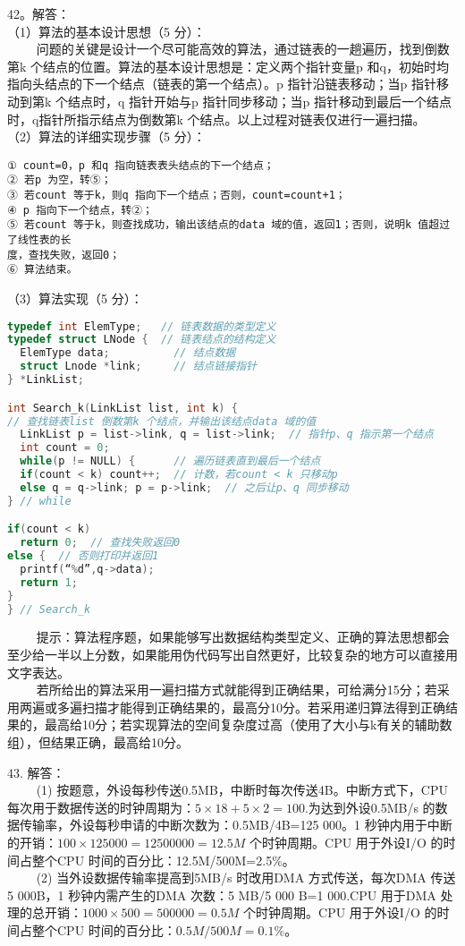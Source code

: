 42。解答： \\
（1）算法的基本设计思想（5 分）： \\
$\qquad$ 问题的关键是设计一个尽可能高效的算法，通过链表的一趟遍历，找到倒数第k 个结点的位置。算法的基本设计思想是：定义两个指针变量p 和q，初始时均指向头结点的下一个结点（链表的第一个结点）。p 指针沿链表移动；当p 指针移动到第k 个结点时，q 指针开始与p 指针同步移动；当p 指针移动到最后一个结点时，q指针所指示结点为倒数第k 个结点。以上过程对链表仅进行一遍扫描。 \\
（2）算法的详细实现步骤（5 分）： 
\begin{lstlisting}[language=none]
① count=0，p 和q 指向链表表头结点的下一个结点；
② 若p 为空，转⑤；
③ 若count 等于k，则q 指向下一个结点；否则，count=count+1；
④ p 指向下一个结点，转②；
⑤ 若count 等于k，则查找成功，输出该结点的data 域的值，返回1；否则，说明k 值超过了线性表的长
度，查找失败，返回0；
⑥ 算法结束。
\end{lstlisting}
（3）算法实现（5 分）： \\
\begin{lstlisting}[language=cpp]
typedef int ElemType;   // 链表数据的类型定义
typedef struct LNode {  // 链表结点的结构定义
  ElemType data;          // 结点数据
  struct Lnode *link;     // 结点链接指针
} *LinkList;

int Search_k(LinkList list, int k) {
// 查找链表list 倒数第k 个结点，并输出该结点data 域的值
  LinkList p = list->link, q = list->link;  // 指针p、q 指示第一个结点
  int count = 0;
  while(p != NULL) {      // 遍历链表直到最后一个结点
  if(count < k) count++;  // 计数，若count < k 只移动p
  else q = q->link; p = p->link;  // 之后让p、q 同步移动
} // while

if(count < k)
  return 0;  // 查找失败返回0
else {  // 否则打印并返回1
  printf(“%d”,q->data);
  return 1;
}
} // Search_k
\end{lstlisting}
$\qquad$ 提示：算法程序题，如果能够写出数据结构类型定义、正确的算法思想都会至少给一半以上分数，如果能用伪代码写出自然更好，比较复杂的地方可以直接用文字表达。 \\
$\qquad$ 若所给出的算法采用一遍扫描方式就能得到正确结果，可给满分15分；若采用两遍或多遍扫描才能得到正确结果的，最高分10分。若采用递归算法得到正确结果的，最高给10分；若实现算法的空间复杂度过高（使用了大小与k有关的辅助数组），但结果正确，最高给10分。

43. 解答： \\
$\qquad$ (1) 按题意，外设每秒传送0.5MB，中断时每次传送4B。中断方式下，CPU 每次用于数据传送的时钟周期为：$5\times18+5\times2=100$.为达到外设0.5MB/s 的数据传输率，外设每秒申请的中断次数为：0.5MB/4B=125 000。1 秒钟内用于中断的开销：$100\times125 000=12 500 000=12.5M$ 个时钟周期。CPU 用于外设I/O 的时间占整个CPU 时间的百分比：12.5M/500M=2.5\%。 \\
$\qquad$ (2) 当外设数据传输率提高到5MB/s 时改用DMA 方式传送，每次DMA 传送5 000B，1 秒钟内需产生的DMA 次数：5 MB/5 000 B=1 000.CPU 用于DMA 处理的总开销：$1 000\times500=500 000=0.5M$ 个时钟周期。CPU 用于外设I/O 的时间占整个CPU 时间的百分比：$0.5M/500M=0.1\%$。

